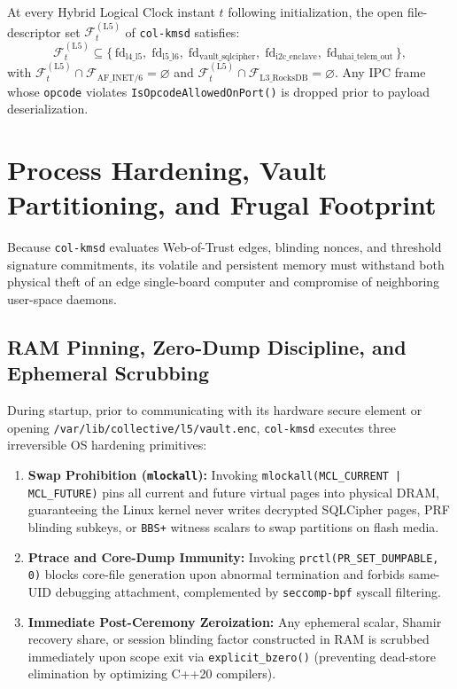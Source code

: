 \begin{invariant}
\label{inv:ch1-l5-containment}
At every Hybrid Logical Clock instant $t$ following initialization, the open file-descriptor
set $\mathcal{F}_t^{(\mathrm{L5})}$ of \texttt{col-kmsd} satisfies:
\[
\mathcal{F}_t^{(\mathrm{L5})} \subseteq \big\{\,
    \mathrm{fd}_{\mathrm{l4\_l5}},\;
    \mathrm{fd}_{\mathrm{l5\_l6}},\;
    \mathrm{fd}_{\mathrm{vault\_sqlcipher}},\;
    \mathrm{fd}_{\mathrm{i2c\_enclave}},\;
    \mathrm{fd}_{\mathrm{uhai\_telem\_out}}
\,\big\},
\]
with $\mathcal{F}_t^{(\mathrm{L5})} \cap \mathcal{F}_{\mathrm{AF\_INET/6}} = \varnothing$ and
$\mathcal{F}_t^{(\mathrm{L5})} \cap \mathcal{F}_{\mathrm{L3\_RocksDB}} = \varnothing$. Any IPC
frame whose \texttt{opcode} violates \texttt{IsOpcodeAllowedOnPort()} is dropped prior to payload
deserialization.
\end{invariant}

\section{Process Hardening, Vault Partitioning, and Frugal Footprint}
\label{sec:ch1-vault-isolation}

Because \texttt{col-kmsd} evaluates Web-of-Trust edges, blinding nonces, and threshold signature
commitments, its volatile and persistent memory must withstand both physical theft of an edge
single-board computer and compromise of neighboring user-space daemons.

\subsection{RAM Pinning, Zero-Dump Discipline, and Ephemeral Scrubbing}

During startup, prior to communicating with its hardware secure element or opening
\texttt{/var/lib/collective/l5/vault.enc}, \texttt{col-kmsd} executes three irreversible OS
hardening primitives:
\begin{enumerate}
\item \textbf{Swap Prohibition (\texttt{mlockall}):} Invoking
        \texttt{mlockall(MCL\_CURRENT | MCL\_FUTURE)} pins all current and future virtual pages
        into physical DRAM, guaranteeing the Linux kernel never writes decrypted SQLCipher
        pages, PRF blinding subkeys, or \texttt{BBS+} witness scalars to swap partitions on
        flash media.
\item \textbf{Ptrace and Core-Dump Immunity:} Invoking \texttt{prctl(PR\_SET\_DUMPABLE, 0)}
        blocks core-file generation upon abnormal termination and forbids same-UID debugging
        attachment, complemented by \texttt{seccomp-bpf} syscall filtering.
\item \textbf{Immediate Post-Ceremony Zeroization:} Any ephemeral scalar, Shamir recovery
        share, or session blinding factor constructed in RAM is scrubbed immediately upon scope
        exit via \texttt{explicit\_bzero()} (preventing dead-store elimination by optimizing
        C++20 compilers).
\end{enumerate}

